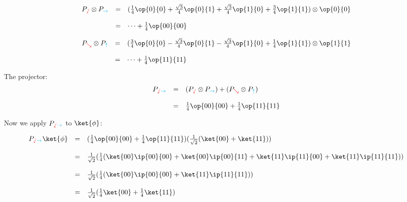 \documentclass{article}
\newcommand{\xplus}{{\color{cyan}\rightarrow}}
\newcommand{\xminus}{{\color{cyan}\uparrow}}
\newcommand{\zplus}{{\color{red}\sswarrow}}
\newcommand{\zminus}{{\color{red}\searrow}}
\theoremstyle{remark}
\def\srtt{\frac{1}{\sqrt{2}}}
\begin{document}
\[
    \begin{array}{rcl}
    P_{\zplus}\otimes P_{\xplus}
        &=& 
            (\frac{1}{4} \op{0}{0} 
                + \frac{\sqrt{3}}{4} \op{0}{1} 
                + \frac{\sqrt{3}}{4} \op{1}{0} 
                + \frac{3}{4} \op{1}{1})
        \otimes \op{0}{0}  
        \\ \\
        &=& \dots + \frac{1}{4}\op{00}{00} 
    \end{array}
\]

\[
    \begin{array}{rcl}
    P_{\zminus}\otimes P_{\xminus}
        &=& (\frac{3}{4} \op{0}{0} 
            - \frac{\sqrt{3}}{4} \op{0}{1} 
            - \frac{\sqrt{3}}{4} \op{1}{0} 
            + \frac{1}{4} \op{1}{1})
        \otimes\op{1}{1}
            \\ \\
        &=& \dots + \frac{1}{4}\op{11}{11} 
    \end{array}
\]


The projector:
\[
    \begin{array}{rcl}
        P_{\zplus\xplus} 
        &=& (P_{\zplus}\otimes P_{\xplus}) + (P_{\zminus} \otimes P_{\xminus}) 
        \\ \\
        &=& \frac{1}{4}\op{00}{00} + \frac{1}{4}\op{11}{11}
    \end{array}
\]

Now we apply $P_{\zplus\xplus}$ to $\ket{\phi}$:

\[
    \begin{array}{rcl}
        P_{\zplus\xplus}\ket{\phi} &=& 
        (\frac{1}{4}\op{00}{00} + \frac{1}{4}\op{11}{11})(\srtt(\ket{00} + \ket{11}))
        \\ \\
        &=&
        \srtt(\frac{1}{4}(\ket{00}\ip{00}{00} 
        + \ket{00}\ip{00}{11} 
        + \ket{11}\ip{11}{00}
        + \ket{11}\ip{11}{11}))
        \\ \\
        &=& 
        \srtt(\frac{1}{4}(\ket{00}\ip{00}{00} + \ket{11}\ip{11}{11}))
        \\ \\
        &=& 
        \srtt(\frac{1}{4}\ket{00} + \frac{1}{4}\ket{11})
        \\ \\
    \end{array}
\]
\end{document}
